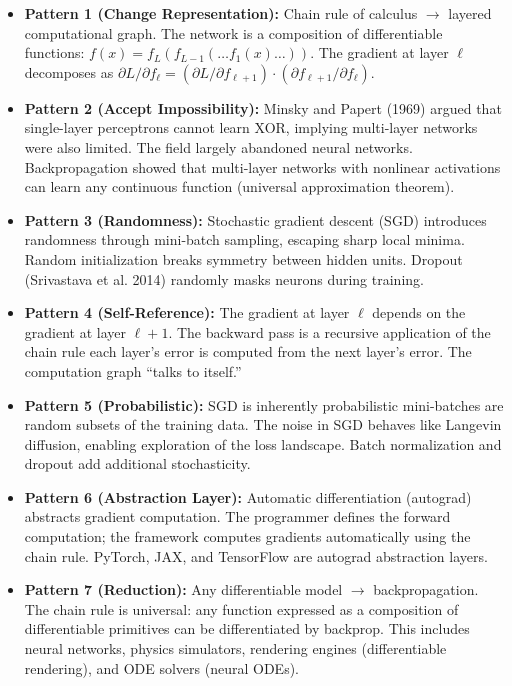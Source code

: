 \begin{itemize}
\item \textbf{Pattern 1 (Change Representation):} Chain rule of calculus $\to$ layered computational graph. The network is a composition of differentiable functions: $f(x) = f_L(f_{L-1}(\dots f_1(x)\dots))$. The gradient at layer $\ell$ decomposes as $\partial L/\partial f_\ell = (\partial L/\partial f_{\ell+1}) \cdot (\partial f_{\ell+1}/\partial f_\ell)$.

\item \textbf{Pattern 2 (Accept Impossibility):} Minsky and Papert (1969) argued that single-layer perceptrons cannot learn XOR, implying multi-layer networks were also limited. The field largely abandoned neural networks. Backpropagation showed that multi-layer networks with nonlinear activations can learn any continuous function (universal approximation theorem).

\item \textbf{Pattern 3 (Randomness):} Stochastic gradient descent (SGD) introduces randomness through mini-batch sampling, escaping sharp local minima. Random initialization breaks symmetry between hidden units. Dropout (Srivastava et al. 2014) randomly masks neurons during training.

\item \textbf{Pattern 4 (Self-Reference):} The gradient at layer $\ell$ depends on the gradient at layer $\ell+1$. The backward pass is a recursive application of the chain rule each layer's error is computed from the next layer's error. The computation graph ``talks to itself.''

\item \textbf{Pattern 5 (Probabilistic):} SGD is inherently probabilistic mini-batches are random subsets of the training data. The noise in SGD behaves like Langevin diffusion, enabling exploration of the loss landscape. Batch normalization and dropout add additional stochasticity.

\item \textbf{Pattern 6 (Abstraction Layer):} Automatic differentiation (autograd) abstracts gradient computation. The programmer defines the forward computation; the framework computes gradients automatically using the chain rule. PyTorch, JAX, and TensorFlow are autograd abstraction layers.

\item \textbf{Pattern 7 (Reduction):} Any differentiable model $\to$ backpropagation. The chain rule is universal: any function expressed as a composition of differentiable primitives can be differentiated by backprop. This includes neural networks, physics simulators, rendering engines (differentiable rendering), and ODE solvers (neural ODEs).


\end{itemize}
